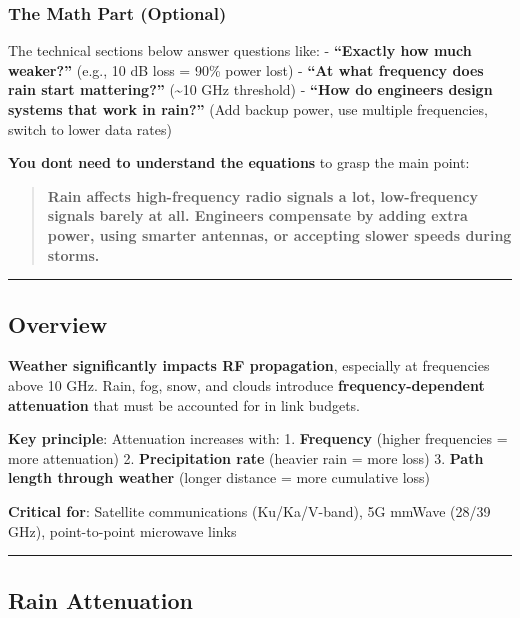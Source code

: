 \subsubsection{The Math Part (Optional)}\label{the-math-part-optional}

The technical sections below answer questions like: - \textbf{``Exactly
how much weaker?''} (e.g., 10 dB loss = 90\% power lost) - \textbf{``At
what frequency does rain start mattering?''} (\textasciitilde10 GHz
threshold) - \textbf{``How do engineers design systems that work in
rain?''} (Add backup power, use multiple frequencies, switch to lower
data rates)

\textbf{You don\textquotesingle t need to understand the equations} to
grasp the main point:

\begin{quote}
\textbf{Rain affects high-frequency radio signals a lot, low-frequency
signals barely at all. Engineers compensate by adding extra power, using
smarter antennas, or accepting slower speeds during storms.}
\end{quote}

\begin{center}\rule{0.5\linewidth}{0.5pt}\end{center}

\subsection{Overview}\label{overview}

\textbf{Weather significantly impacts RF propagation}, especially at
frequencies above 10 GHz. Rain, fog, snow, and clouds introduce
\textbf{frequency-dependent attenuation} that must be accounted for in
link budgets.

\textbf{Key principle}: Attenuation increases with: 1.
\textbf{Frequency} (higher frequencies = more attenuation) 2.
\textbf{Precipitation rate} (heavier rain = more loss) 3. \textbf{Path
length through weather} (longer distance = more cumulative loss)

\textbf{Critical for}: Satellite communications (Ku/Ka/V-band), 5G
mmWave (28/39 GHz), point-to-point microwave links

\begin{center}\rule{0.5\linewidth}{0.5pt}\end{center}

\subsection{Rain Attenuation}\label{rain-attenuation}

